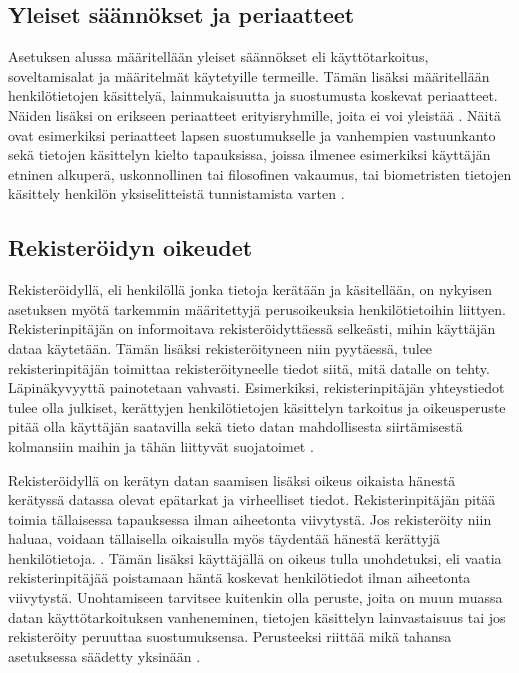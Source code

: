 \documentclass[finnish]{tktltiki}
\begin{document}
\subsection{Yleiset säännökset ja periaatteet}

Asetuksen alussa määritellään yleiset säännökset eli käyttötarkoitus, soveltamisalat ja määritelmät käytetyille termeille. Tämän lisäksi määritellään henkilötietojen käsittelyä, lainmukaisuutta ja suostumusta koskevat periaatteet. Näiden lisäksi on erikseen periaatteet erityisryhmille, joita ei voi yleistää \cite{eu2016,tikkinen}. Näitä ovat esimerkiksi periaatteet lapsen suostumukselle ja vanhempien vastuunkanto sekä tietojen käsittelyn kielto tapauksissa, joissa ilmenee esimerkiksi käyttäjän etninen alkuperä, uskonnollinen tai filosofinen vakaumus, tai biometristen tietojen käsittely henkilön yksiselitteistä tunnistamista varten \cite{eu2016,tikkinen}.

\subsection{Rekisteröidyn oikeudet}

Rekisteröidyllä, eli henkilöllä jonka tietoja kerätään ja käsitellään, on nykyisen asetuksen myötä tarkemmin määritettyjä perusoikeuksia henkilötietoihin liittyen. Rekisterinpitäjän on informoitava rekisteröidyttäessä selkeästi, mihin käyttäjän dataa käytetään. Tämän lisäksi rekisteröityneen niin pyytäessä, tulee rekisterinpitäjän toimittaa rekisteröityneelle tiedot siitä, mitä datalle on tehty. Läpinäkyvyyttä painotetaan vahvasti. Esimerkiksi, rekisterinpitäjän yhteystiedot tulee olla julkiset, kerättyjen henkilötietojen käsittelyn tarkoitus ja oikeusperuste pitää olla käyttäjän saatavilla sekä tieto datan mahdollisesta siirtämisestä kolmansiin maihin ja tähän liittyvät suojatoimet \cite{tikkinen}.

Rekisteröidyllä on kerätyn datan saamisen lisäksi oikeus oikaista hänestä kerätyssä datassa olevat epätarkat ja virheelliset tiedot. Rekisterinpitäjän pitää toimia tällaisessa tapauksessa ilman aiheetonta viivytystä. Jos rekisteröity niin haluaa, voidaan tällaisella oikaisulla myös täydentää hänestä kerättyjä henkilötietoja. \cite{eu2016}. Tämän lisäksi käyttäjällä on oikeus tulla unohdetuksi, eli vaatia rekisterinpitäjää poistamaan häntä koskevat henkilötiedot ilman aiheetonta viivytystä. Unohtamiseen tarvitsee kuitenkin olla peruste, joita on muun muassa datan käyttötarkoituksen vanheneminen, tietojen käsittelyn lainvastaisuus tai jos rekisteröity peruuttaa suostumuksensa. Perusteeksi riittää mikä tahansa asetuksessa säädetty yksinään \cite{eu2016,tikkinen}.
\end{document}

